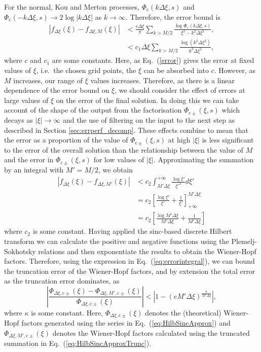 \documentclass[11pt,a4paper]{article}
\begin{document}
For the normal, Kou and Merton processes, $\Phi_{\mathrm{c}}(k\Delta\xi,s)$ and $\Phi_{\mathrm{c}}(-k\Delta\xi,s)\rightarrow2\log|k\Delta\xi|$ as $k\!\rightarrow\!\infty$. Therefore, the error bound is
\begin{align}
\label{error}
|f_{\Delta\xi}(\xi)-f_{\Delta\xi,M}(\xi)| &< \frac{c\Delta\xi}{\pi}\sum_{k>M/2}\frac{\log\Phi_{\mathrm{c}}(k\Delta\xi,s)}{\xi^{2}-k^{2} \Delta\xi ^{2}},\nonumber\\
& < c_\mathrm{1} \Delta\xi \sum_{k>M/2}\frac{\log(k^{2} \Delta\xi ^{2})}{k^{2} \Delta\xi ^{2}},
\end{align}
where $c$ and $c_\mathrm{1}$ are some constants. Here, as Eq.~(\ref{error}) gives the error at fixed values of $\xi$, i.e.\ the chosen grid points, the $\xi$ can be absorbed into $c$. However, as $M$ increases, our range of $\xi$ values increases. Therefore, as there is a linear dependence of the error bound on $\xi$, we should consider the effect of errors at large values of $\xi$ on the error of the final solution. In doing this we can take account of the shape of the output from the factorisation $\Phi_{\mathrm{c}\pm}(\xi,s)$ which decays as $|\xi|\rightarrow\infty$ and the use of filtering on the input to the next step as described in Section \ref{sec:errperf_decomp}. These effects combine to mean that the error as a proportion of the value of $\Phi_{\mathrm{c}\pm}(\xi,s)$ at high $|\xi|$ is less significant to the error of the overall solution than the relationship between the value of $M$ and the error in $\Phi_{\mathrm{c}\pm}(\xi,s)$ for low values of $|\xi|$.
Approximating the summation by an integral with $M'=M/2$, we obtain
\begin{align}
|f_{\Delta\xi}(\xi)-f_{\Delta\xi,M'}(\xi)| &<c_\mathrm{2}\int^{+\infty}_{M' \Delta\xi}\frac{\log{\xi'}}{{\xi'^{2}}}d\xi' \nonumber\\
& = c_\mathrm{2} \left[\frac{\log \xi'}{\xi'} +\frac{1}{\xi'}\right] _{+\infty}^{M'\Delta\xi}\nonumber\\
& = c_\mathrm{2}\left[\frac{\log M' \Delta\xi}{M' \Delta\xi} +\frac{1}{M' \Delta\xi}\right]\label{eq:errorintegral}
\end{align}
where $c_\mathrm{2}$ is some constant.
Having applied the sinc-based discrete Hilbert transform we can calculate the positive and negative functions using the Plemelj-Sokhotsky relations and then exponentiate the results to obtain the Wiener-Hopf factors. Therefore, using the expression in Eq.~(\ref{eq:errorintegral}), we can bound the truncation error of the Wiener-Hopf factors, and by extension the total error as the truncation error dominates, as
\begin{equation}
\left|\frac{\Phi_{\Delta\xi,\mathrm{c}\pm}(\xi)-\Phi_{\Delta\xi,M',\mathrm{c}\pm}(\xi)}{\Phi_{\Delta\xi,\mathrm{c}\pm}(\xi)}\right|<\left|1-(eM'\Delta\xi)^\frac{\kappa}{M'\Delta\xi}\right|,\label{eq:facterrest}
\end{equation}
where $\kappa$ is some constant. Here, $\Phi_{\Delta\xi,\mathrm{c}\pm}(\xi)$ denotes the (theoretical) Wiener-Hopf factors generated using the series in Eq.~(\ref{eq:HilbSincApprox}) and $\Phi_{\Delta\xi,M',\mathrm{c}\pm}(\xi)$ denotes the Wiener-Hopf factors calculated using the truncated summation in Eq.~(\ref{eq:HilbSincApproxTrunc}).
\end{document}
